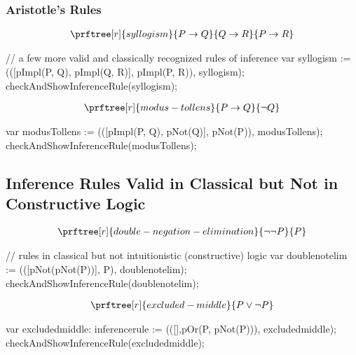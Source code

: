 \documentclass[letterpaper,10pt,english]{sphinxmanual}
\begin{document}
\subsubsection{Aristotle’s Rules}
\label{\detokenize{13-consequence:aristotle-s-rules}}\begin{equation*}
\begin{split}\prftree[r]{syllogism}{P \rightarrow Q}{Q \rightarrow R}{P \rightarrow R}\end{split}
\end{equation*}
\begin{sphinxVerbatim}[commandchars=\\\{\}]
// a few more valid and classically recognized rules of inference
var syllogism    := (([pImpl(P, Q), pImpl(Q, R)], pImpl(P, R)), \PYGZdq{}syllogism\PYGZdq{});
checkAndShowInferenceRule(syllogism);
\end{sphinxVerbatim}
\begin{equation*}
\begin{split}\prftree[r]{modus-tollens}{P \rightarrow Q}{\neg Q}\end{split}
\end{equation*}
\begin{sphinxVerbatim}[commandchars=\\\{\}]
var modusTollens := (([pImpl(P, Q), pNot(Q)], pNot(P)), \PYGZdq{}modusTollens\PYGZdq{});
checkAndShowInferenceRule(modusTollens);
\end{sphinxVerbatim}


\subsection{Inference Rules Valid in Classical but Not in Constructive Logic}
\label{\detokenize{13-consequence:inference-rules-valid-in-classical-but-not-in-constructive-logic}}\begin{equation*}
\begin{split}\prftree[r]{double-negation-elimination}{\neg{\neg P}}{P}\end{split}
\end{equation*}
\begin{sphinxVerbatim}[commandchars=\\\{\}]
// rules in classical but not intuitionistic (constructive) logic
var double\PYGZus{}not\PYGZus{}elim := (([pNot(pNot(P))], P), \PYGZdq{}double\PYGZus{}not\PYGZus{}elim\PYGZdq{});
checkAndShowInferenceRule(double\PYGZus{}not\PYGZus{}elim);
\end{sphinxVerbatim}
\begin{equation*}
\begin{split}\prftree[r]{excluded-middle}{P \lor {\neg P}}\end{split}
\end{equation*}
\begin{sphinxVerbatim}[commandchars=\\\{\}]
var excluded\PYGZus{}middle: inference\PYGZus{}rule := (([],pOr(P, pNot(P))), \PYGZdq{}excluded\PYGZus{}middle\PYGZdq{});
 checkAndShowInferenceRule(excluded\PYGZus{}middle);
\end{sphinxVerbatim}
\end{document}
